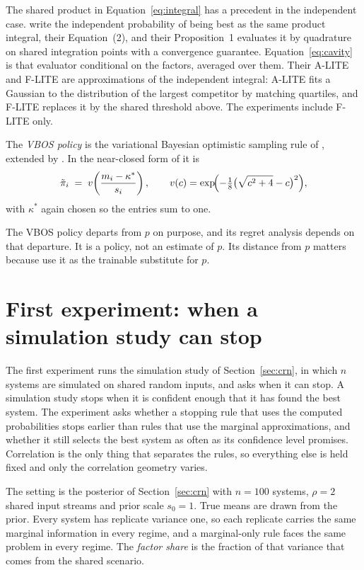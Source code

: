 \documentclass[11pt]{article}
\begin{document}
The shared product in Equation~\eqref{eq:integral} has a precedent in
the independent case. \citet{menet2025} write the independent
probability of being best as the same product integral, their
Equation~(2), and their Proposition~1 evaluates it by quadrature on
shared integration points with a convergence guarantee.
Equation~\eqref{eq:cavity} is that evaluator conditional on the
factors, averaged over them. Their A-LITE and F-LITE are
approximations of the independent integral: A-LITE fits a Gaussian to
the distribution of the largest competitor by matching quartiles, and
F-LITE replaces it by the shared threshold above. The experiments
include F-LITE only.

The \emph{VBOS policy} is the variational Bayesian optimistic sampling
rule of \citet{odonoghue2021}, extended by \citet{tarbouriech2023}. In
the near-closed form of \citet{menet2026} it is
\begin{equation}
\tilde{\pi}_i \;=\; v\!\left(\frac{m_i - \kappa^*}{s_i}\right),
\qquad v(c) = \exp\!\Bigl(-\tfrac{1}{8}\bigl(\sqrt{c^2 + 4} -
c\bigr)^2\Bigr),
\label{eq:vbos}
\end{equation}
with $\kappa^*$ again chosen so the entries sum to one.

The VBOS policy departs from $p$ on purpose, and its regret analysis
depends on that departure. It is a policy, not an estimate of $p$.
Its distance from $p$ matters because \citet{menet2026} use it as
the trainable substitute for $p$.

\section{First experiment: when a simulation study can stop}
\label{sec:stopping}

The first experiment runs the simulation study of
Section~\ref{sec:crn}, in which $n$ systems are simulated on shared
random inputs, and asks when it can stop. A simulation study stops
when it is confident enough that it has found the best system. The
experiment asks whether a stopping rule
that uses the computed probabilities stops earlier than rules that use the
marginal approximations, and whether it still selects the best system
as often as its confidence level promises. Correlation is the only
thing that separates the rules, so everything else is held fixed and
only the correlation geometry varies.

The setting is the posterior of Section~\ref{sec:crn} with $n = 100$
systems, $\rho = 2$ shared input streams and prior scale $s_0 = 1$. True
means are drawn from the prior. Every system has replicate variance
one, so each replicate carries the same marginal information in every
regime, and a marginal-only rule faces the same problem in every
regime. The \emph{factor share} is the fraction of that variance that
comes from the shared scenario.
\end{document}
